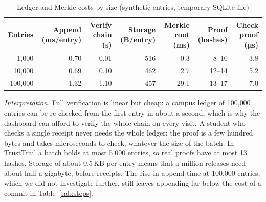 \begin{table}[t]
\centering
\caption{Ledger and Merkle costs by size (synthetic entries, temporary SQLite file)}
\label{tab:scaling}
\small
\begin{tabular}{@{}rrrrrrr@{}}
\toprule
Entries & Append (ms/entry) & Verify chain (s) & Storage (B/entry) & Merkle root (ms) & Proof (hashes) & Check proof (µs) \\
\midrule
1{,}000 & 0.70 & 0.01 & 516 & 0.3 & 8--10 & 3.8 \\
10{,}000 & 0.69 & 0.10 & 462 & 2.7 & 12--14 & 5.2 \\
100{,}000 & 1.32 & 1.10 & 457 & 29.1 & 13--17 & 7.0 \\
\bottomrule
\end{tabular}
\end{table}

\emph{Interpretation.} Full verification is linear but cheap: a campus ledger of 100{,}000 entries can be re-checked from the first entry in about a second, which is why the dashboard can afford to verify the whole chain on every visit. A student who checks a single receipt never needs the whole ledger: the proof is a few hundred bytes and takes microseconds to check, whatever the size of the batch. In TrustTrail a batch holds at most 5{,}000 entries, so real proofs have at most 13 hashes. Storage of about 0.5\,KB per entry means that a million releases need about half a gigabyte, before receipts. The rise in append time at 100{,}000 entries, which we did not investigate further, still leaves appending far below the cost of a commit in Table~\ref{tab:steps}.

